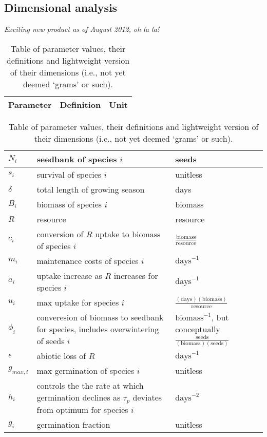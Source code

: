\documentclass[11pt,a4paper,oneside]{article}
\begin{document}
\subsection{Dimensional analysis}
\noindent \emph{Exciting new product as of August 2012, oh la la!}
\begin{center}
\begin{table}[h!]
\caption{Table of parameter values, their definitions and lightweight version of their dimensions (i.e., not yet deemed `grams' or such).}
\begin{tabular}{ | p{3.0cm} | p{6.0cm} | p{4.0cm} |}
\hline 
Parameter & Definition & Unit \\ \hline 
\end{tabular}
\begin{tabular}{ | p{3.0cm} | p{6.0cm} | p{4.0cm} |}
\(N_{i}\) & seedbank of species \(i\) & seeds \\ \hline
\(s_{i}\) & survival of species \(i\) & unitless \\ \hline
\(\delta\) & total length of growing season & days\\ \hline
\(B_{i}\) & biomass of species \(i\) & biomass \\ \hline
\(R\) & resource & resource\\ \hline
\(c_{i}\) & conversion of \(R\) uptake to biomass of species \(i\) &  \(\frac{\text{biomass}}{\text{resource}}\) \\ \hline
\(m_{i}\) & maintenance costs of species \(i\) & \(\text{days}^{-1}\) \\ \hline
\(a_{i}\) & uptake increase as \(R\) increases for species \(i\) & \(\text{days}^{-1}\) \\ \hline
\(u_{i}\) & max uptake for species \(i\) & \(\frac{(\text{days})(\text{biomass})}{\text{resource}}\) \\ \hline
\(\phi_{i}\) & converesion of biomass to seedbank for species, includes overwintering of seeds \(i\) & \(\text{biomass}^{-1}\), but conceptually \(\frac{\text{seeds}}{(\text{biomass})(\text{seeds})}\) \\ \hline
\(\epsilon\) & abiotic loss of \(R\) &  \(\text{days}^{-1}\) \\ \hline
\(g_{max,i}\) & max germination of species \(i\) & unitless \\ \hline
\(h_{i}\) &  controls the the rate at which germination declines as \(\tau_{p}\) deviates from optimum for species \(i\)  & \(\text{days}^{-2}\) \\ \hline
\(g_{i}\) & germination fraction & unitless \\ \hline

\end{tabular}
\end{table}
\end{center}
\end{document}
